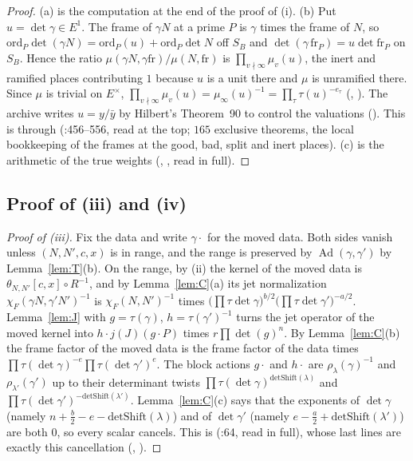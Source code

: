 \documentclass[11pt]{article}
\newcommand{\Ad}{\operatorname{Ad}}
\theoremstyle{definition}
\theoremstyle{remark}
\begin{document}
\begin{proof}
(a) is the computation at the end of the proof of (i). (b) Put $u=\det\gamma\in E^1$. The frame of $\gamma N$ at a prime $P$ is $\gamma$ times the frame of $N$, so $\mathrm{ord}_P\det(\gamma N)=\mathrm{ord}_P(u)+\mathrm{ord}_P\det N$ off $S_B$ and $\det(\gamma\,\mathrm{fr}_P)=u\det\mathrm{fr}_P$ on $S_B$. Hence the ratio $\mu(\gamma N,\gamma\mathrm{fr})/\mu(N,\mathrm{fr})$ is $\prod_{v\nmid\infty}\mu_v(u)$, the inert and ramified places contributing $1$ because $u$ is a unit there and $\mu$ is unramified there. Since $\mu$ is trivial on $E^\times$, $\prod_{v\nmid\infty}\mu_v(u)=\mu_\infty(u)^{-1}=\prod_\tau\tau(u)^{-e_\tau}$ (, ). The archive writes $u=y/\bar y$ by Hilbert's Theorem~90 to control the valuations (). This is  through  (:456--556, read at the top; $165$ exclusive theorems, the local bookkeeping of the frames at the good, bad, split and inert places). (c) is the arithmetic of the true weights (, , read in full).
\end{proof}

\subsection{Proof of (iii) and (iv)}

\begin{proof}[Proof of (iii)]
Fix the data and write $\gamma\cdot$ for the moved data. Both sides vanish unless $(N,N',c,x)$ is in range, and the range is preserved by $\Ad(\gamma,\gamma')$ by Lemma~\ref{lem:T}(b). On the range, by (ii) the kernel of the moved data is $\theta_{N,N'}[c,x]\circ R^{-1}$, and by Lemma~\ref{lem:C}(a) its jet normalization $\chi_F(\gamma N,\gamma'N')^{-1}$ is $\chi_F(N,N')^{-1}$ times $\bigl(\prod\tau\det\gamma\bigr)^{b/2}\bigl(\prod\tau\det\gamma'\bigr)^{-a/2}$. Lemma~\ref{lem:J} with $g=\tau(\gamma)$, $h=\tau(\gamma')^{-1}$ turns the jet operator of the moved kernel into $h\cdot j(J)(g\cdot P)$ times $r\prod\det(g)^{n}$. By Lemma~\ref{lem:C}(b) the frame factor of the moved data is the frame factor of the data times $\prod\tau(\det\gamma)^{-e}\prod\tau(\det\gamma')^{e}$. The block actions $g\cdot$ and $h\cdot$ are $\rho_\lambda(\gamma)^{-1}$ and $\rho_{\lambda'}(\gamma')$ up to their determinant twists $\prod\tau(\det\gamma)^{\mathrm{detShift}(\lambda)}$ and $\prod\tau(\det\gamma')^{-\mathrm{detShift}(\lambda')}$. Lemma~\ref{lem:C}(c) says that the exponents of $\det\gamma$ (namely $n+\tfrac b2-e-\mathrm{detShift}(\lambda)$) and of $\det\gamma'$ (namely $e-\tfrac a2+\mathrm{detShift}(\lambda')$) are both $0$, so every scalar cancels. This is  (:64, read in full), whose last lines are exactly this cancellation (, ).
\end{proof}
\end{document}
